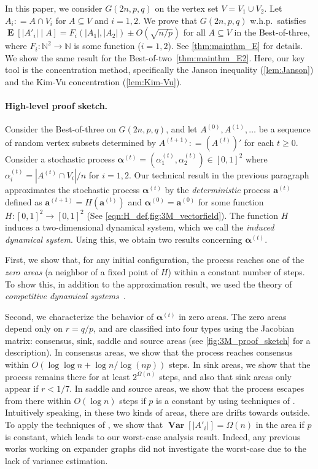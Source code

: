 \documentclass[letterpaper,11pt]{article}
\DeclareMathOperator{\E}{\mathbf{E}}
\newcommand{\Var}{\mathop{\mathbf{Var}}}%
\def\defeq{\mathrel{\mathop:}=}%
\begin{document}
In this paper, we consider $G(2n,p,q)$ on the vertex set $V=V_1\cup V_2$.
Let $A_i\defeq A\cap V_i$ for $A\subseteq V$ and $i=1,2$.
We prove that $G(2n,p,q)$ w.h.p.~satisfies $\E[|A'_i|\mid A] = F_i(|A_1|,|A_2|) \pm O(\sqrt{n/p})$ for all $A\subseteq V$ in the Best-of-three, where $F_i:\mathbb{N}^2\to\mathbb{N}$ is some function ($i=1,2$). See \cref{thm:mainthm_E} for details. 
We show the same result for the Best-of-two~\cref{thm:mainthm_E2}.
Here, our key tool is the concentration method, specifically the Janson inequality (\cref{lem:Janson}) and the Kim-Vu concentration (\cref{lem:Kim-Vu}).



\paragraph*{High-level proof sketch.}
% 

Consider the Best-of-three on $G(2n,p,q)$, and let $A^{(0)}, A^{(1)}, \ldots$ be a sequence of random vertex subsets determined by $A^{(t+1)}\defeq (A^{(t)})'$ for each $t\geq 0$.
Consider a stochastic process ${\boldsymbol \alpha}^{(t)}=(\alpha_1^{(t)}, \alpha_2^{(t)})\in [0,1]^2$ where $\alpha^{(t)}_i=|A^{(t)}\cap V_i|/n$ for $i=1,2$.
Our technical result in the previous paragraph approximates the stochastic process ${\boldsymbol \alpha}^{(t)}$ by the {\em deterministic} process $\mathbf{a}^{(t)}$ defined as $\mathbf{a}^{(t+1)}=H(\mathbf{a}^{(t)})$ and ${\boldsymbol \alpha}^{(0)}=\mathbf{a}^{(0)}$ for some function $H: [0,1]^2\to [0,1]^2$ (See \cref{eqn:H_def,fig:3M_vectorfield}).
The function $H$ induces a two-dimensional dynamical system, which we call the \emph{induced dynamical system}.
Using this, we obtain two results concerning ${\boldsymbol \alpha}^{(t)}$.

First, we show that, for any initial configuration, the process reaches one of the {\em zero areas} (a neighbor of a fixed point of $H$) within a constant number of steps.
To show this, in addition to the approximation result, we used the theory of \emph{competitive dynamical systems}~\cite{HS05}.

Second, we characterize the behavior of ${\boldsymbol \alpha}^{(t)}$ in zero areas.
The zero areas depend only on $r=q/p$, and are classified into four types using the Jacobian matrix:
consensus, sink, saddle and source areas (see \cref{fig:3M_proof_sketch} for a description).
In consensus areas, we show that the process reaches consensus within $O(\log \log n+\log n/\log(np))$ steps.
In sink areas, we show that the process remains there for at least $2^{\Omega(n)}$ steps, and also that sink areas only appear if $r<1/7$. 
In saddle and source areas, we show that the process escapes from there within $O(\log n)$ steps if $p$ is a constant by using techniques of \cite{DGMSS11}.
Intuitively speaking, in these two kinds of areas, there are drifts towards outside.
To apply the techniques of \cite{DGMSS11}, we show that $\Var[|A'_i|]=\Omega(n)$ in the area if $p$ is constant, which leads to our worst-case analysis result.
Indeed, any previous works working on expander graphs did not investigate the worst-case due to the lack of variance estimation.
\end{document}
